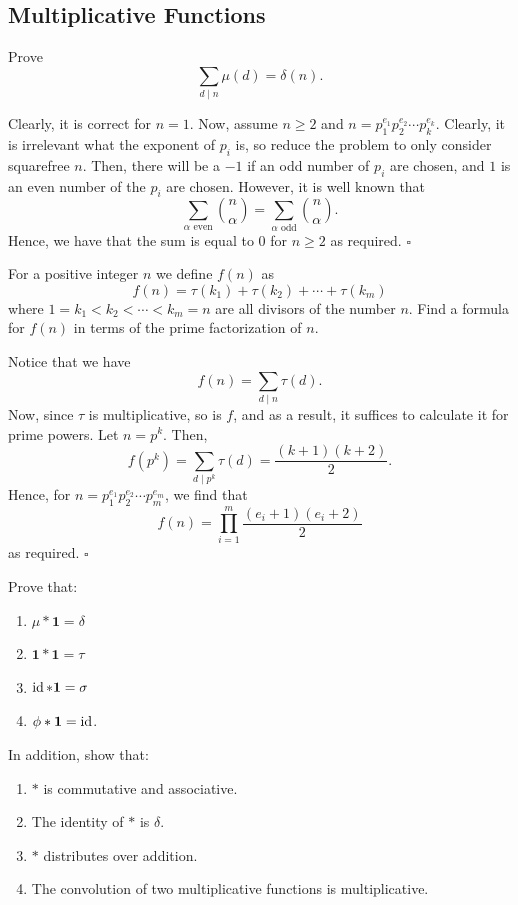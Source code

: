 \documentclass{article}
\begin{document}
\subsection{Multiplicative Functions}

\begin{problem}[3.4.1]{}
Prove \[\sum_{d\mid n} \mu(d) = \delta(n).\]
\end{problem}

Clearly, it is correct for $n = 1$. Now, assume $n \ge 2$ and $n = p_1^{e_1}p_2^{e_2}\cdots p_k^{e_k}$. Clearly, it is irrelevant what the exponent of $p_i$ is, so reduce the problem to only consider squarefree $n$. Then, there will be a $-1$ if an odd number of $p_i$ are chosen, and $1$ is an even number of the $p_i$ are chosen. However, it is well known that \[\sum_{\alpha\text{ even}}\binom{n}{\alpha} = \sum_{\alpha\text{ odd}}\binom{n}{\alpha}.\] Hence, we have that the sum is equal to $0$ for $n\ge 2$ as required. $\square$

\begin{problem}[3.4.2]{}
For a positive integer $n$ we define $f(n)$ as \[f(n) = \tau(k_1) + \tau(k_2) + \cdots + \tau(k_m)\] where $1 = k_1 < k_2 < \cdots < k_m = n$ are all divisors of the number $n$. Find a formula for $f(n)$ in terms of the prime factorization of $n$.
\end{problem}

Notice that we have \[f(n) = \sum_{d \mid n}\tau(d).\] Now, since $\tau$ is multiplicative, so is $f$, and as a result, it suffices to calculate it for prime powers. Let $n = p^k$. Then, \[f(p^k) = \sum_{d \mid p^k}\tau(d) = \dfrac{(k+1)(k+2)}{2}.\] Hence, for $n = p_1^{e_1}p_2^{e_2}\cdots p_m^{e_m}$, we find that \[f(n) = \prod_{i=1}^m \dfrac{(e_i+1)(e_i+2)}{2}\] as required. $\square$

\begin{problem}[3.4.3]{}
Prove that:
\begin{enumerate}
\item $\mu * \mathbf{1} = \delta$
\item $\mathbf{1} * \mathbf{1} = \tau$
\item $\operatorname{id} * \mathbf{1} = \sigma$
\item $\phi * \mathbf{1} = \operatorname{id}$.
\end{enumerate}
In addition, show that:
\begin{enumerate}
\item $*$ is commutative and associative.
\item The identity of $*$ is $\delta$.
\item $*$ distributes over addition.
\item The convolution of two multiplicative functions is multiplicative.
\end{enumerate}
\end{problem}
\end{document}
